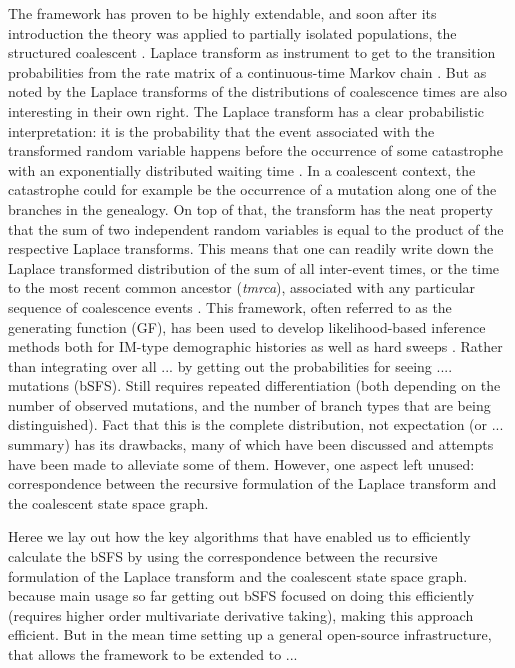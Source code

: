 \documentclass[10pt, a4]{article}
\begin{document}
The framework has proven to be highly extendable, and soon after its introduction the theory was applied to partially isolated populations, the structured coalescent \citep{Takahata1988, Notohara1990, Barton1995}. Laplace transform as instrument to get to the transition probabilities from the rate matrix of a continuous-time Markov chain \citep{Takahata1988, Griffiths1991, Wilkinson-herbots1998}. But as noted by \citet{Wilkinson-herbots1998} the Laplace transforms of the distributions of coalescence times are also interesting in their own right. The Laplace transform has a clear probabilistic interpretation: it is the probability that the event associated with the transformed random variable happens before the occurrence of some catastrophe with an exponentially distributed waiting time \citep{Rade1972}. In a coalescent context, the catastrophe could for example be the occurrence of a mutation along one of the branches in the genealogy. On top of that, the transform has the neat property that the sum of two independent random variables is equal to the product of the respective Laplace transforms. This means that one can readily write down the Laplace transformed distribution of the sum of all inter-event times, or the time to the most recent common ancestor (\textit{tmrca}), associated with any particular sequence of coalescence events \citep{Lohse2011}. This framework, often referred to as the generating function (GF), has been used to develop likelihood-based inference methods both for IM-type demographic histories as well as hard sweeps \citep{Lohse2011, Bunnefeld2015, Lohse2016, Bisschop2021}. Rather than integrating over all ... by getting out the probabilities for seeing .... mutations (bSFS). Still requires repeated differentiation (both depending on the number of observed mutations, and the number of branch types that are being distinguished). 
Fact that this is the complete distribution, not expectation (or ... summary) has its drawbacks, many of which have been discussed and attempts have been made to alleviate some of them. However, one aspect left unused: correspondence between the recursive formulation of the Laplace transform and the coalescent state space graph.

Heree we lay out how the key algorithms that have enabled us to efficiently calculate the bSFS by using the correspondence between the recursive formulation of the Laplace transform and the coalescent state space graph.
because main usage so far getting out bSFS focused on doing this efficiently (requires higher order multivariate derivative taking), making this approach efficient. But in the mean time setting up a general open-source infrastructure, that allows the framework to be extended to ...
\end{document}
